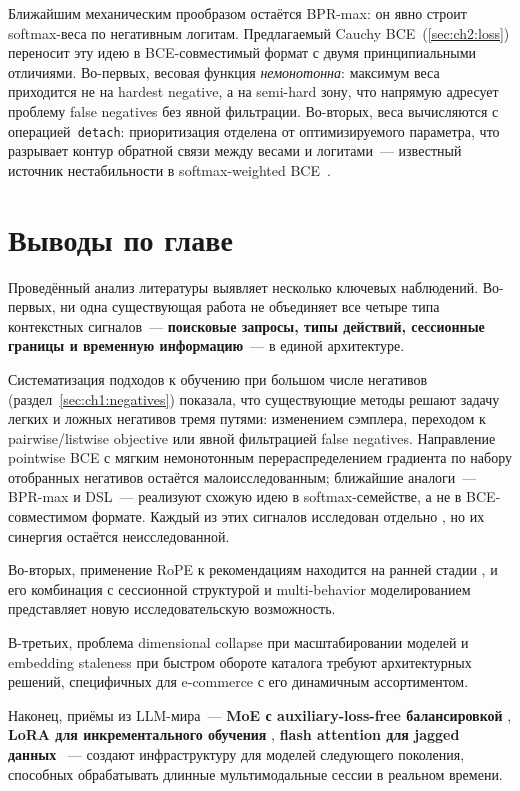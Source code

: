 Ближайшим механическим прообразом остаётся BPR-max: он явно строит softmax-веса по негативным
логитам. Предлагаемый Cauchy BCE~(\ref{sec:ch2:loss}) переносит эту идею в BCE-совместимый
формат с двумя принципиальными отличиями. Во-первых, весовая функция \emph{немонотонна}: максимум
веса приходится не на hardest negative, а на semi-hard зону, что напрямую адресует проблему false
negatives без явной фильтрации. Во-вторых, веса вычисляются с операцией~\texttt{detach}:
приоритизация отделена от оптимизируемого параметра, что разрывает контур обратной связи между
весами и логитами~--- известный источник нестабильности в softmax-weighted BCE~\cite{petrov2023gsasrec}.

\section{Выводы по главе}
\label{sec:ch1:summary}

Проведённый анализ литературы выявляет несколько ключевых наблюдений. Во-первых, ни одна существующая работа не объединяет все четыре типа контекстных сигналов~--- \textbf{поисковые запросы, типы действий, сессионные границы и временную информацию}~--- в единой архитектуре.

Систематизация подходов к обучению при большом числе негативов (раздел~\ref{sec:ch1:negatives}) показала, что существующие методы решают задачу легких и ложных негативов тремя путями: изменением сэмплера, переходом к pairwise/listwise objective или явной фильтрацией false negatives. Направление pointwise BCE с мягким немонотонным перераспределением градиента по набору отобранных негативов остаётся малоисследованным; ближайшие аналоги~--- BPR-max и DSL~--- реализуют схожую идею в softmax-семействе, а не в BCE-совместимом формате. Каждый из этих сигналов исследован отдельно \cite{he2022queryaware, yuan2022mbstr, seol2022session, li2020tisasrec}, но их синергия остаётся неисследованной.

Во-вторых, применение RoPE к рекомендациям находится на ранней стадии \cite{wei2025torope, hu2025recgrela}, и его комбинация с сессионной структурой и multi-behavior моделированием представляет новую исследовательскую возможность.

В-третьих, проблема dimensional collapse при масштабировании моделей \cite{guo2024collapse} и embedding staleness при быстром обороте каталога \cite{meta2025semantic} требуют архитектурных решений, специфичных для e-commerce с его динамичным ассортиментом.

Наконец, приёмы из LLM-мира~--- \textbf{MoE с auxiliary-loss-free балансировкой} \cite{wang2024deepseek}, \textbf{LoRA для инкрементального обучения} \cite{hu2022lora}, \textbf{flash attention для jagged данных} \cite{ivchenko2022torchrec}~--- создают инфраструктуру для моделей следующего поколения, способных обрабатывать длинные мультимодальные сессии в реальном времени.

